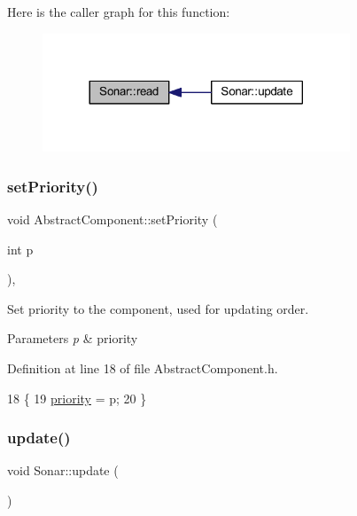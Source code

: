 Here is the caller graph for this function\+:\nopagebreak
\begin{figure}[H]
\begin{center}
\leavevmode
\includegraphics[width=260pt]{class_sonar_af7a8bb36d925d164b31ff271f9006dc7_icgraph}
\end{center}
\end{figure}
\mbox{\label{class_abstract_component_a58a59a9ea6c3b4c86fb3bf98ff1eaaef}} 
\subsubsection{\texorpdfstring{set\+Priority()}{setPriority()}}
{\footnotesize\ttfamily void Abstract\+Component\+::set\+Priority (\begin{DoxyParamCaption}\item[{int}]{p }\end{DoxyParamCaption})\hspace{0.3cm}{\ttfamily [inline]}, {\ttfamily [inherited]}}



Set priority to the component, used for updating order. 


\begin{DoxyParams}{Parameters}
{\em p} & priority \\
\hline
\end{DoxyParams}


Definition at line 18 of file Abstract\+Component.\+h.


\begin{DoxyCode}
18                             \{
19         \hyperlink{class_abstract_component_aff57dfa5f31be093a06b55560e33fb95}{priority} = p;
20     \}
\end{DoxyCode}
\mbox{\label{class_sonar_aaf10dd734528b86b4dea3ab35c4ee4f4}} 
\subsubsection{\texorpdfstring{update()}{update()}}
{\footnotesize\ttfamily void Sonar\+::update (\begin{DoxyParamCaption}{ }\end{DoxyParamCaption})\hspace{0.3cm}{\ttfamily [virtual]}}



